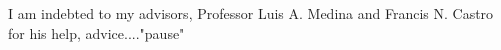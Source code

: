 




\vspace{1cm}

I am indebted to my advisors, Professor Luis A. Medina and Francis N. Castro for his help, advice...."pause" 
